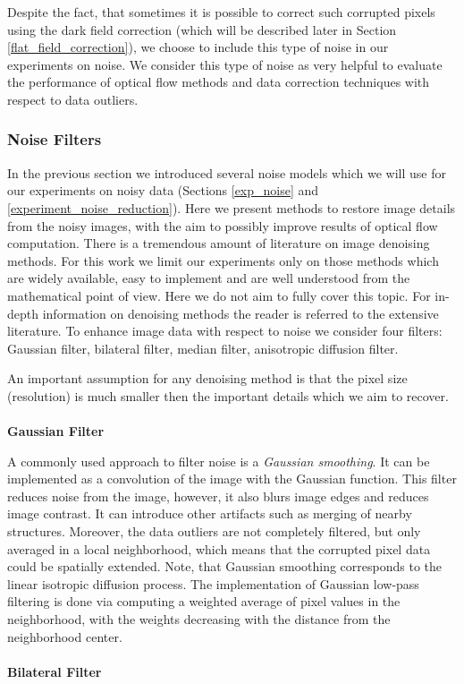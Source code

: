 Despite the fact, that sometimes it is possible to correct such corrupted pixels using the dark field correction (which will be described later in Section \ref{flat_field_correction}), we choose to include this type of noise in our experiments on noise. We consider this type of noise as very helpful to evaluate  the performance of optical flow methods and data correction techniques with respect to data outliers.
   


\subsubsection{Noise Filters}
\label{noise_filters}
         
In the previous section we introduced several noise models which we will use for our experiments on noisy data (Sections \ref{exp_noise} and \ref{experiment_noise_reduction}). Here we present methods to restore image details from the noisy images, with the aim to possibly improve results of optical flow computation. There is a tremendous amount of literature on image denoising methods. For this work we limit our experiments only on those methods which are widely available, easy to implement and are well understood from the mathematical point of view. Here we do not aim to fully cover this topic. For in-depth information on denoising methods the reader is referred to the extensive literature. To enhance image data with respect to noise we consider four filters: Gaussian filter, bilateral filter, median filter, anisotropic diffusion filter.

An important assumption for any denoising method is that the pixel size (resolution) is much smaller then the important details which we aim to recover.  
\\ 
\\
\textbf{Gaussian Filter}

A commonly used approach to filter noise is a \textit{Gaussian smoothing}. 
It can be implemented as a convolution of the image with the Gaussian function. This  filter reduces noise  from the image, however, it also blurs image edges and reduces image contrast.   It can introduce other artifacts such as merging of nearby structures. Moreover, the data outliers are not completely filtered, but only averaged in a local neighborhood, which means that the corrupted pixel data could be spatially extended. Note, that Gaussian smoothing corresponds to the linear isotropic diffusion process. The implementation of Gaussian low-pass filtering is done via computing a weighted average of pixel values in the neighborhood, with the
weights decreasing with the distance from the neighborhood center.
\\ 
\\
\textbf{Bilateral Filter}

